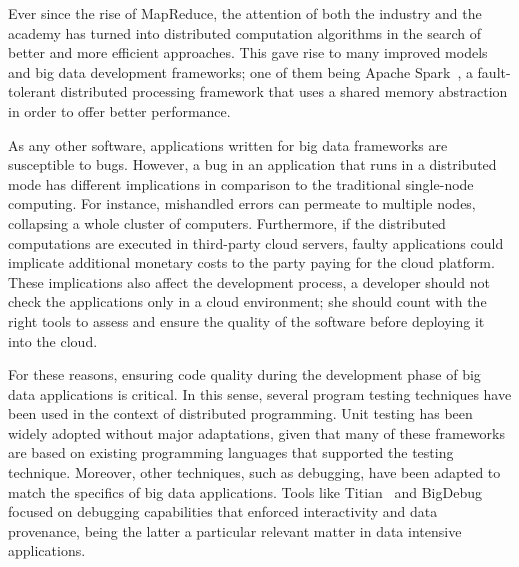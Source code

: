Ever since the rise of MapReduce, the attention of both the industry and the academy has turned into distributed computation algorithms in the search of better and more efficient approaches. This gave rise to many improved models and big data development frameworks; one of them being Apache Spark~\cite{Zaharia2012a}, a fault-tolerant distributed processing framework that uses a shared memory abstraction in order to offer better performance.






As any other software, applications written for big data frameworks are susceptible to bugs. However, a bug in an application that runs in a distributed mode has different implications in comparison to the traditional single-node computing. For instance, mishandled errors can permeate to multiple nodes, collapsing a whole cluster of computers. Furthermore, if the distributed computations are executed in third-party cloud servers, faulty applications could implicate additional monetary costs to the party paying for the cloud platform. These implications also affect the development process, a developer should not check the applications only in a cloud environment; she should count with the right tools to assess and ensure the quality of the software before deploying it into the cloud.

For these reasons, ensuring code quality during the development phase of big data applications is critical. In this sense, several program testing techniques have been used in the context of distributed programming. Unit testing has been widely adopted without major adaptations, given that many of these frameworks are based on existing programming languages that supported the testing technique. Moreover, other techniques, such as debugging, have been adapted to match the specifics of big data applications. Tools like Titian~\cite{Interlandi2015} and BigDebug~\cite{Gulzar2016} focused on debugging capabilities that enforced interactivity and data provenance, being the latter a particular relevant matter in data intensive applications.

